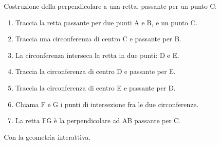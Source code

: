 \begin{procedura}[Perpendicolare]\label{proc:fonda_perpendicolare}
  Costruzione della perpendicolare a una retta, passante per un punto C:
  \begin{enumerate} [nosep]
    \item 
    Traccia la retta passante per due punti A e B, e un punto C.
    \item 
    Traccia una circonferenza di centro C e passante per B. 
    \item 
    La circonferenza interseca la retta in due punti: D e E.
    \item 
    Traccia la circonferenza di centro D e passante per E.
    \item 
    Traccia la circonferenza di centro E e passante per D.
    \item 
    Chiama F e G i punti di intersezione fra le due circonferenze.
    \item 
    La retta FG è la perpendicolare ad AB passante per C.
  \end{enumerate}
\end{procedura}

\ifcoding
Con la geometria interattiva.


\fi

